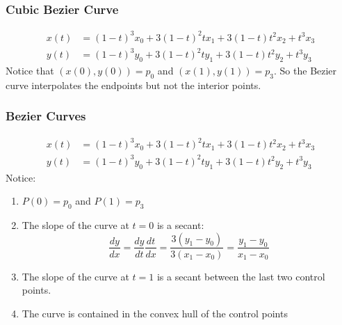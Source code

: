 \documentclass[10pt]{beamer}
\begin{document}
\begin{frame}
\frametitle{Cubic Bezier Curve}
\begin{align*}
  x(t) & = (1-t)^3 x_0 + 3(1-t)^2 t x_1 + 3(1-t)t^2 x_2 + t^3 x_3\\
  y(t) & = (1-t)^3 y_0 + 3(1-t)^2 t y_1 + 3(1-t)t^2 y_2 + t^3 y_3
\end{align*}
Notice that $(x(0),y(0))=p_0$ and $(x(1),y(1))=p_3$.  So the Bezier
curve interpolates the endpoints but not the interior points.
\bigskip

\begin{center}
\end{center}

\end{frame}
\begin{frame}
\frametitle{Bezier Curves}
\begin{align*}
  x(t) & = (1-t)^3 x_0 + 3(1-t)^2 t x_1 + 3(1-t)t^2 x_2 + t^3 x_3\\
  y(t) & = (1-t)^3 y_0 + 3(1-t)^2 t y_1 + 3(1-t)t^2 y_2 + t^3 y_3
\end{align*}
Notice:
\begin{enumerate}
  \item $P(0)=p_0$ and $P(1)=p_3$
  \item The slope of the curve at $t=0$ is a secant:
\begin{equation*}
  \frac{dy}{dx} = \frac{dy}{dt}\frac{dt}{dx} = \frac{3(y_1-y_0)}{3(x_1-x_0)}
  = \frac{y_1-y_0}{x_1-x_0}
\end{equation*}
  \item The slope of the curve at $t=1$ is a secant between the last two
control points.
  \item The curve is contained in the convex hull of the control points
\end{enumerate}
\end{frame}
\end{document}

